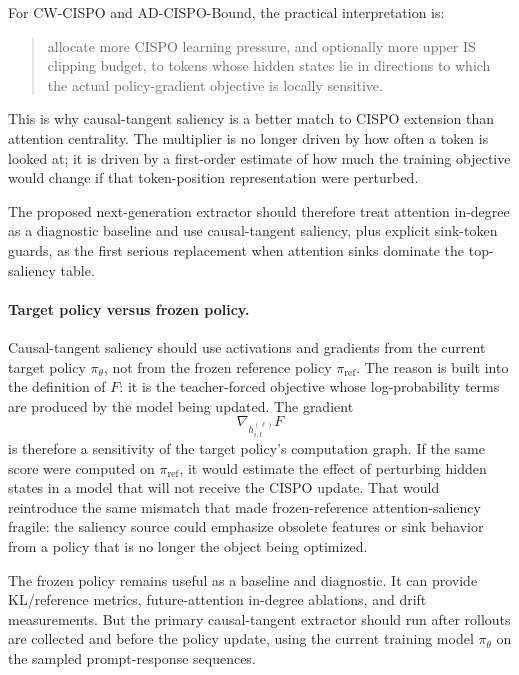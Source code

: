 \documentclass[11pt]{article}
\begin{document}
For CW-CISPO and AD-CISPO-Bound, the practical interpretation is:
\begin{quote}
  allocate more CISPO learning pressure, and optionally more upper IS clipping
  budget, to tokens whose hidden states lie in directions to which the actual
  policy-gradient objective is locally sensitive.
\end{quote}
This is why causal-tangent saliency is a better match to CISPO extension than
attention centrality. The multiplier is no longer driven by how often a token
is looked at; it is driven by a first-order estimate of how much the training
objective would change if that token-position representation were perturbed.

The proposed next-generation extractor should therefore treat attention
in-degree as a diagnostic baseline and use causal-tangent saliency, plus
explicit sink-token guards, as the first serious replacement when attention
sinks dominate the top-saliency table.

\paragraph{Target policy versus frozen policy.}
Causal-tangent saliency should use activations and gradients from the current
target policy $\pi_\theta$, not from the frozen reference policy
$\pi_{\mathrm{ref}}$. The reason is built into the definition of $F$: it is the
teacher-forced objective whose log-probability terms are produced by the model
being updated. The gradient
\begin{equation}
  \nabla_{h^{(\ell)}_{i,t}} F
\end{equation}
is therefore a sensitivity of the target policy's computation graph. If the
same score were computed on $\pi_{\mathrm{ref}}$, it would estimate the effect
of perturbing hidden states in a model that will not receive the CISPO update.
That would reintroduce the same mismatch that made frozen-reference
attention-saliency fragile: the saliency source could emphasize obsolete
features or sink behavior from a policy that is no longer the object being
optimized.

The frozen policy remains useful as a baseline and diagnostic. It can provide
KL/reference metrics, future-attention in-degree ablations, and drift
measurements. But the primary causal-tangent extractor should run after
rollouts are collected and before the policy update, using the current
training model $\pi_\theta$ on the sampled prompt-response sequences.
\end{document}
